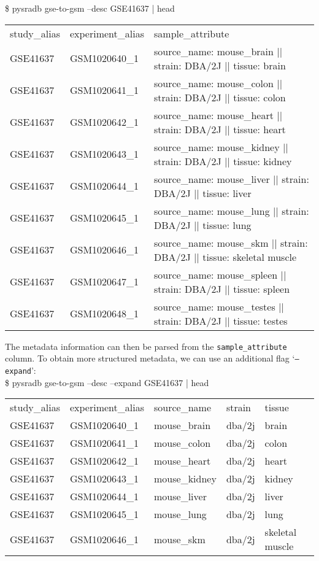 \documentclass[9pt,a4paper]{extarticle}
\newenvironment{allintypewriter}{\ttfamily}{\par}
\begin{document}
\begin{allintypewriter}
\$ pysradb gse-to-gsm --desc GSE41637 | head
\begin{table}[H]
    \begin{tabular}{lll}
        study_alias & experiment_alias & sample_attribute\\
        GSE41637 & GSM1020640_1 &  source_name: mouse_brain || strain: DBA/2J || tissue: brain\\
        GSE41637 & GSM1020641_1 &  source_name: mouse_colon || strain: DBA/2J || tissue: colon\\
        GSE41637 & GSM1020642_1 &  source_name: mouse_heart || strain: DBA/2J || tissue: heart\\
        GSE41637 & GSM1020643_1 &  source_name: mouse_kidney || strain: DBA/2J || tissue: kidney\\
        GSE41637 & GSM1020644_1 &  source_name: mouse_liver || strain: DBA/2J || tissue: liver\\
        GSE41637 & GSM1020645_1 &  source_name: mouse_lung || strain: DBA/2J || tissue: lung\\
        GSE41637 & GSM1020646_1 &  source_name: mouse_skm || strain: DBA/2J || tissue: skeletal muscle\\
        GSE41637 & GSM1020647_1 &  source_name: mouse_spleen || strain: DBA/2J || tissue: spleen\\
        GSE41637 & GSM1020648_1 &  source_name: mouse_testes || strain: DBA/2J || tissue: testes
    \end{tabular}
\end{table}
\end{allintypewriter}

The metadata information can then be parsed from the \texttt{sample\_attribute} column.
To obtain more structured metadata, we can use an additional flag `\texttt{--expand}':\\

\begin{allintypewriter}
\$ pysradb gse-to-gsm --desc --expand GSE41637 | head
\begin{table}[H]
    \begin{tabular}{lllll}
        study_alias & experiment_alias & source_name &  strain & tissue\\
        GSE41637 & GSM1020640_1 &  mouse_brain &  dba/2j & brain\\
        GSE41637 & GSM1020641_1 &  mouse_colon &  dba/2j & colon\\
        GSE41637 & GSM1020642_1 &  mouse_heart &  dba/2j & heart\\
        GSE41637 & GSM1020643_1 &  mouse_kidney & dba/2j & kidney\\
        GSE41637 & GSM1020644_1 &  mouse_liver &  dba/2j & liver\\
        GSE41637 & GSM1020645_1 &  mouse_lung & dba/2j & lung\\
        GSE41637 & GSM1020646_1 &  mouse_skm & dba/2j & skeletal muscle
    \end{tabular}
\end{table}
\end{allintypewriter}
~\\
\end{document}
